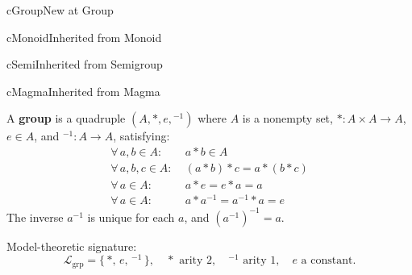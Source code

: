 \clearpage\thispagestyle{plain}

\begin{bpnew}{cGroup}{New at Group}
\end{bpnew}

\begin{bpinh}{cMonoid}{Inherited from Monoid}
\end{bpinh}

\begin{bpinh}{cSemi}{Inherited from Semigroup}
\end{bpinh}

\begin{bpinh}{cMagma}{Inherited from Magma}
\end{bpinh}

\begin{definition}[Group]
\label{def:formal-model-theoretic-structures-l499}
  A \textbf{group} is a quadruple $(A, *, e, {}^{-1})$ where $A$ is a nonempty
  set, $* : A \times A \to A$, $e \in A$, and ${}^{-1} : A \to A$, satisfying:
  \begin{align*}
    \forall\,a,b \in A:&\; a * b \in A \tag{Closure}\\
    \forall\,a,b,c \in A:&\; (a*b)*c = a*(b*c) \tag{Associativity}\\
    \forall\,a \in A:&\; a * e = e * a = a \tag{Identity}\\
    \forall\,a \in A:&\; a * a^{-1} = a^{-1} * a = e \tag{Inverses}
  \end{align*}
  The inverse $a^{-1}$ is unique for each $a$, and $(a^{-1})^{-1} = a$.

  \medskip\noindent
  Model-theoretic signature:
  \[
    \mathcal{L}_{\mathrm{grp}} = \{\,*,\, e,\, {}^{-1}\,\},
    \quad * \text{ arity } 2,\quad {}^{-1} \text{ arity } 1,\quad
    e \text{ a constant.}
  \]
\end{definition}

